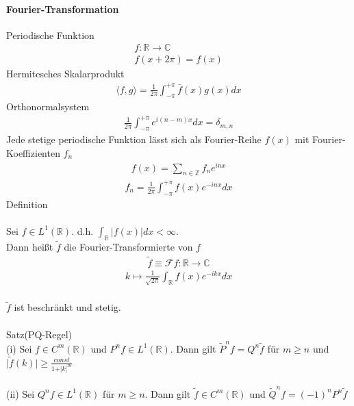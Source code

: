\documentclass[10pt,a4paper]{article}
\begin{document}
\paragraph{Fourier-Transformation} $\, $ \\
Periodische Funktion
\begin{align}
f: \mathbb{R} \longrightarrow \mathbb{C} \\
f(x+2 \pi) = f(x)
\end{align}
Hermitesches Skalarprodukt
\begin{align}
\langle f,g \rangle = \frac{1}{2 \pi} \int_{-\pi}^{+ \pi} \bar{f}(x) g(x) dx
\end{align}
Orthonormalsystem
\begin{align}
\frac{1}{2 \pi} \int_{- \pi}^{+ \pi} e^{i(n-m)x} dx = \delta_{m,n}
\end{align}
Jede stetige periodische Funktion lässt sich als Fourier-Reihe $ f(x) $ mit Fourier-Koeffizienten $f_n$
\begin{align}
f(x)= \sum_{n \in \mathbb{Z}} f_n e^{inx}
\end{align}
\begin{align}
f_n = \frac{1}{2 \pi} \int_{- \pi}^{+ \pi} f(x) e^{-inx} dx
\end{align}
Definition\\
\\
Sei $ f \in L^1(\mathbb{R})$. d.h. $ \int_{\mathbb{R}} \vert
f(x) \vert dx < \infty $.\\
Dann heißt $ \tilde{f} $ die Fourier-Transformierte von $f$
\begin{align}
\tilde{f}\equiv  \mathcal{F}f: \mathbb{R} \longrightarrow \mathbb{C}
\end{align}
\begin{align}
k \longmapsto \frac{1}{\sqrt{2 \pi}} \int_{\mathbb{R}} f(x) e^{-ikx} dx
\end{align}
\\
$ \tilde{f} $ ist beschränkt und stetig.\\
\\
Satz(PQ-Regel)
\\
(i) Sei $ f \in C^m(\mathbb{R}) $ und $ P^nf \in L^1 (\mathbb{R})$. Dann gilt $\tilde{P}^nf = Q^n \tilde{f}$ für $ m \geq n $ und $ \vert \tilde{f}(k) \vert \geq \frac{const}{1+ \vert k \vert ^m} $ \\
\\
(ii) Sei $ Q^nf \in L^1(\mathbb{R})$ für $ m \geq n $. Dann gilt $ \tilde{f} \in C^m(\mathbb{R}) $ und $ \tilde{Q}^nf = (-1)^n P^n \tilde{f} $ \\
\end{document}
